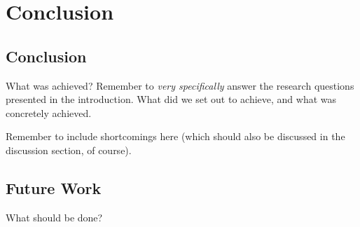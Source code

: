\chapter{Conclusion}

\section{Conclusion}

What was achieved? Remember to \textit{very specifically} answer the research
questions presented in the introduction. What did we set out to achieve, and
what was concretely achieved.

Remember to include shortcomings here (which should also be discussed in the
discussion section, of course).

\section{Future Work}

What should be done?

